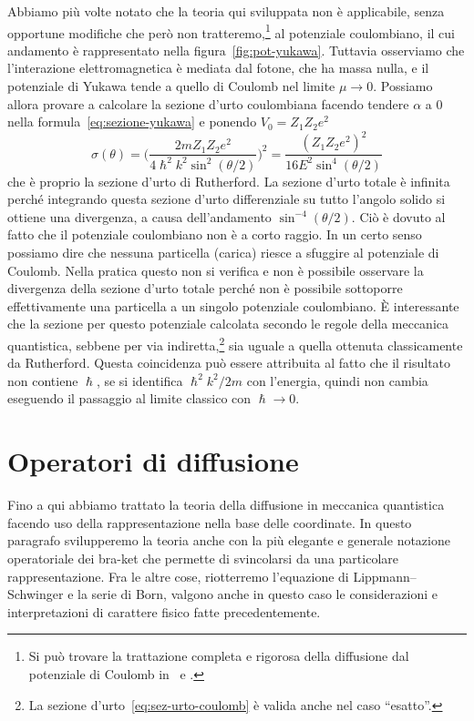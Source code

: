 \documentclass[a4paper,fleqn,twoside,12pt]{article}
\begin{document}
Abbiamo più volte notato che la teoria qui sviluppata non è applicabile, senza
opportune modifiche che però non
tratteremo,\footnote{Si può trovare la trattazione completa e rigorosa della
  diffusione dal potenziale di Coulomb
  in~\textcite[368-373]{gottfried:quantum-mechanics} e
  \textcites[655-659]{landau:meccanica-quantistica}.}
al potenziale coulombiano, il cui andamento è rappresentato nella
figura~\ref{fig:pot-yukawa}.  Tuttavia osserviamo che l'interazione
elettromagnetica è mediata dal fotone, che ha massa nulla, e il potenziale di
Yukawa tende a quello di Coulomb nel limite $\mu \to 0$.  Possiamo allora
provare a calcolare la sezione d'urto coulombiana facendo tendere $\alpha$ a $0$
nella formula~\eqref{eq:sezione-yukawa} e ponendo $V_{0} = Z_{1}Z_{2}e^{2}$
\begin{equation}
  \label{eq:sez-urto-coulomb}
  \sigma(\theta) =
  \bigg(\frac{2mZ_{1}Z_{2}e^{2}}{4\hslash^{2}k^{2}\sin^{2}(\theta/2)}\bigg)^{2}=
  \frac{(Z_{1}Z_{2}e^{2})^{2}}{16E^{2}\sin^{4}(\theta/2)}
\end{equation}
che è proprio la sezione d'urto di Rutherford.  La sezione d'urto totale è
infinita perché integrando questa sezione d'urto differenziale su tutto l'angolo
solido si ottiene una divergenza, a causa dell'andamento $\sin^{-4}(\theta/2)$.
Ciò è dovuto al fatto che il potenziale coulombiano non è a corto raggio.  In un
certo senso possiamo dire che nessuna particella (carica) riesce a sfuggire al
potenziale di Coulomb.  Nella pratica questo non si verifica e non è possibile
osservare la divergenza della sezione d'urto totale perché non è possibile
sottoporre effettivamente una particella a un singolo potenziale coulombiano.  È
interessante che la sezione per questo potenziale calcolata secondo le regole
della meccanica quantistica, sebbene per via
indiretta,\footnote{La sezione d'urto~\eqref{eq:sez-urto-coulomb} è valida anche
  nel caso ``esatto''.}
sia uguale a quella ottenuta classicamente da Rutherford.  Questa coincidenza
può essere attribuita al fatto che il risultato non contiene $\hslash$, se si
identifica $\hslash^{2}k^{2}/2m$ con l'energia, quindi non cambia eseguendo il
passaggio al limite classico con $\hslash \to 0$.

\section{Operatori di diffusione}
\label{sec:operatori-diffusione}

Fino a qui abbiamo trattato la teoria della diffusione in meccanica quantistica
facendo uso della rappresentazione nella base delle coordinate.  In questo
paragrafo svilupperemo la teoria anche con la più elegante e generale notazione
operatoriale dei bra-ket che permette di svincolarsi da una particolare
rappresentazione.  Fra le altre cose, riotterremo l'equazione di
Lippmann–Schwinger e la serie di Born, valgono anche in questo caso le
considerazioni e interpretazioni di carattere fisico fatte precedentemente.
\end{document}
